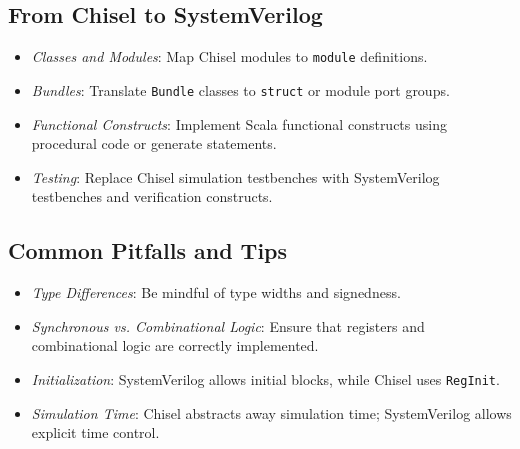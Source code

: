 \subsection{From Chisel to SystemVerilog}

\begin{itemize}
    \item \textit{Classes and Modules}: Map Chisel modules to \texttt{module} definitions.
    \item \textit{Bundles}: Translate \texttt{Bundle} classes to \texttt{struct} or module port groups.
    \item \textit{Functional Constructs}: Implement Scala functional constructs using procedural code or generate statements.
    \item \textit{Testing}: Replace Chisel simulation testbenches with SystemVerilog testbenches and verification constructs.
\end{itemize}

\subsection{Common Pitfalls and Tips}

\begin{itemize}
    \item \textit{Type Differences}: Be mindful of type widths and signedness.
    \item \textit{Synchronous vs. Combinational Logic}: Ensure that registers and combinational logic are correctly implemented.
    \item \textit{Initialization}: SystemVerilog allows initial blocks, while Chisel uses \texttt{RegInit}.
    \item \textit{Simulation Time}: Chisel abstracts away simulation time; SystemVerilog allows explicit time control.
\end{itemize}




